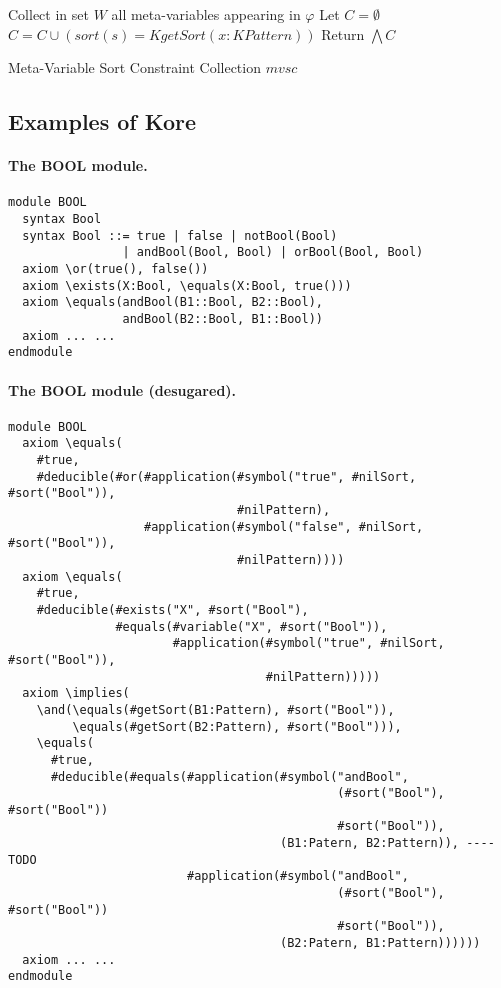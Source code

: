 \documentclass[UTF8]{article}
\theoremstyle{plain}
\theoremstyle{definition}
\theoremstyle{remark}
\newcommand{\cln}{{:}}
\newcommand{\KPattern}{\mathit{KPattern}}
\newcommand{\KgetSort}{\mathit{KgetSort}}
\begin{document}
\begin{algorithm}
	Collect in set $W$ all meta-variables appearing in $\varphi$\;
	Let $C = \emptyset$\;
	\ForEach{$x \cln \cln s \in W$}
	{$C = C \cup (\mathit{sort(s)} = \KgetSort(x \cln \KPattern))$}
	Return $\bigwedge C$\;
	\caption{Meta-Variable Sort Constraint Collection $\mathit{mvsc}$}
	\label{alg:mvsc}
\end{algorithm}


\subsection{Examples of Kore}
\label{sec:examples-of-kore}


\paragraph{The {\small BOOL} module.}\quad
\begin{Verbatim}[fontsize=\small]
module BOOL
  syntax Bool
  syntax Bool ::= true | false | notBool(Bool)
                | andBool(Bool, Bool) | orBool(Bool, Bool)
  axiom \or(true(), false())
  axiom \exists(X:Bool, \equals(X:Bool, true()))
  axiom \equals(andBool(B1::Bool, B2::Bool), 
                andBool(B2::Bool, B1::Bool))
  axiom ... ...
endmodule
\end{Verbatim}

\paragraph{The {\small BOOL} module (desugared).}\quad
\begin{Verbatim}[fontsize=\small]
module BOOL
  axiom \equals(
    #true,
    #deducible(#or(#application(#symbol("true", #nilSort, #sort("Bool")),
                                #nilPattern), 
                   #application(#symbol("false", #nilSort, #sort("Bool")),
                                #nilPattern))))
  axiom \equals(
    #true,
    #deducible(#exists("X", #sort("Bool"), 
               #equals(#variable("X", #sort("Bool")), 
                       #application(#symbol("true", #nilSort, #sort("Bool")),
                                    #nilPattern)))))
  axiom \implies(
    \and(\equals(#getSort(B1:Pattern), #sort("Bool")), 
         \equals(#getSort(B2:Pattern), #sort("Bool"))),
    \equals(
      #true,
      #deducible(#equals(#application(#symbol("andBool", 
                                              (#sort("Bool"), #sort("Bool"))
                                              #sort("Bool")), 
                                      (B1:Patern, B2:Pattern)), ---- TODO
                         #application(#symbol("andBool", 
                                              (#sort("Bool"), #sort("Bool"))
                                              #sort("Bool")), 
                                      (B2:Patern, B1:Pattern))))))
  axiom ... ...
endmodule
\end{Verbatim}
\end{document}
